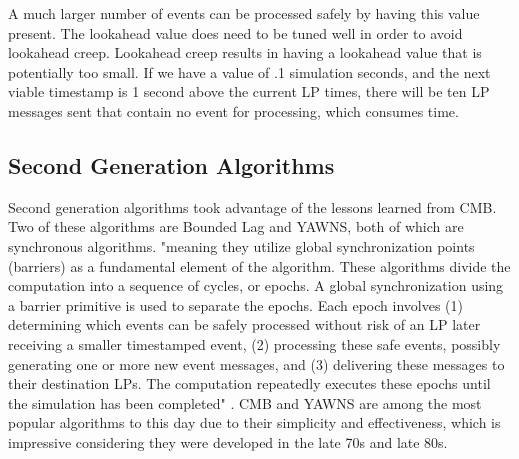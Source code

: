 \documentclass[conference]{IEEEtran}
\begin{document}
A much larger number of events can be processed safely by having this value present. The lookahead value does need to be tuned well in order to avoid lookahead creep. Lookahead creep results in having a lookahead value that is potentially too small. If we have a value of .1 simulation seconds, and the next viable timestamp is 1 second above the current LP times, there will be ten LP messages sent that contain no event for processing, which consumes time.

\subsection{Second Generation Algorithms}
Second generation algorithms took advantage of the lessons learned from CMB. Two of these algorithms are Bounded Lag and YAWNS, both of which are synchronous algorithms. "meaning they utilize global synchronization points (barriers) as a fundamental element of the algorithm. These algorithms divide the computation into a sequence of cycles, or epochs. A global synchronization using a barrier primitive is used to separate the epochs. Each epoch involves (1) determining which events can be safely processed without risk of an LP later receiving a smaller timestamped event, (2) processing these safe events, possibly generating one or more new event messages, and (3) delivering these messages to their destination LPs. The computation repeatedly executes these epochs until the simulation has been completed" \cite{b2}. CMB and YAWNS are among the most popular algorithms to this day due to their simplicity and effectiveness, which is impressive considering they were developed in the late 70s and late 80s.
\end{document}
